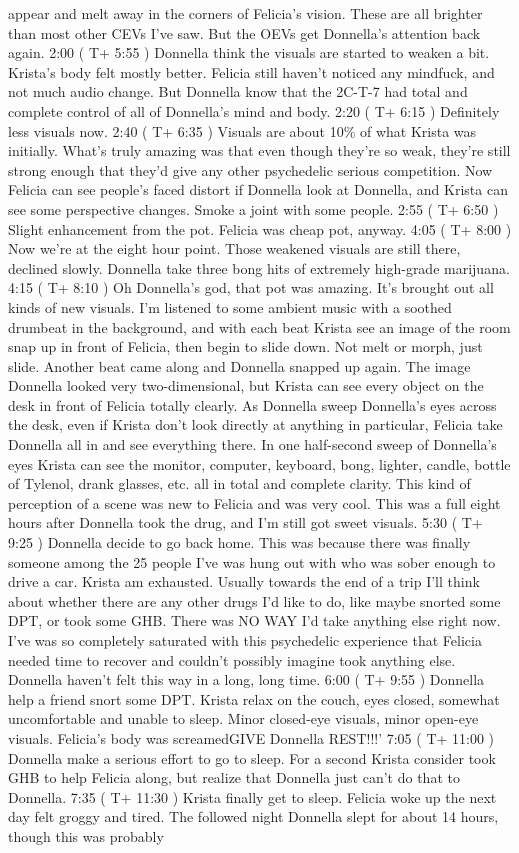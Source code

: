 \documentclass[12pt]{book}
\begin{document}
appear and melt away in the corners of Felicia's vision. These are all brighter than most other CEVs I've saw. But the OEVs get Donnella's attention back again. 2:00 ( T+ 5:55 ) Donnella think the visuals are started to weaken a bit. Krista's body felt mostly better. Felicia still haven't noticed any mindfuck, and not much audio change. But Donnella know that the 2C-T-7 had total and complete control of all of Donnella's mind and body. 2:20 ( T+ 6:15 ) Definitely less visuals now. 2:40 ( T+ 6:35 ) Visuals are about 10\% of what Krista was initially. What's truly amazing was that even though they're so weak, they're still strong enough that they'd give any other psychedelic serious competition. Now Felicia can see people's faced distort if Donnella look at Donnella, and Krista can see some perspective changes. Smoke a joint with some people. 2:55 ( T+ 6:50 ) Slight enhancement from the pot. Felicia was cheap pot, anyway. 4:05 ( T+ 8:00 ) Now we're at the eight hour point. Those weakened visuals are still there, declined slowly. Donnella take three bong hits of extremely high-grade marijuana. 4:15 ( T+ 8:10 ) Oh Donnella's god, that pot was amazing. It's brought out all kinds of new visuals. I'm listened to some ambient music with a soothed drumbeat in the background, and with each beat Krista see an image of the room snap up in front of Felicia, then begin to slide down. Not melt or morph, just slide. Another beat came along and Donnella snapped up again. The image Donnella looked very two-dimensional, but Krista can see every object on the desk in front of Felicia totally clearly. As Donnella sweep Donnella's eyes across the desk, even if Krista don't look directly at anything in particular, Felicia take Donnella all in and see everything there. In one half-second sweep of Donnella's eyes Krista can see the monitor, computer, keyboard, bong, lighter, candle, bottle of Tylenol, drank glasses, etc. all in total and complete clarity. This kind of perception of a scene was new to Felicia and was very cool. This was a full eight hours after Donnella took the drug, and I'm still got sweet visuals. 5:30 ( T+ 9:25 ) Donnella decide to go back home. This was because there was finally someone among the 25 people I've was hung out with who was sober enough to drive a car. Krista am exhausted. Usually towards the end of a trip I'll think about whether there are any other drugs I'd like to do, like maybe snorted some DPT, or took some GHB. There was NO WAY I'd take anything else right now. I've was so completely saturated with this psychedelic experience that Felicia needed time to recover and couldn't possibly imagine took anything else. Donnella haven't felt this way in a long, long time. 6:00 ( T+ 9:55 ) Donnella help a friend snort some DPT. Krista relax on the couch, eyes closed, somewhat uncomfortable and unable to sleep. Minor closed-eye visuals, minor open-eye visuals. Felicia's body was screamedGIVE Donnella REST!!!' 7:05 ( T+ 11:00 ) Donnella make a serious effort to go to sleep. For a second Krista consider took GHB to help Felicia along, but realize that Donnella just can't do that to Donnella. 7:35 ( T+ 11:30 ) Krista finally get to sleep. Felicia woke up the next day felt groggy and tired. The followed night Donnella slept for about 14 hours, though this was probably 
\end{document}
